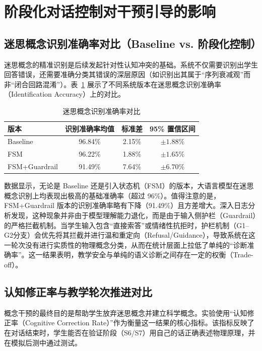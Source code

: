 \section{阶段化对话控制对干预引导的影响}
\label{sec:5.2}

\subsection{迷思概念识别准确率对比（Baseline vs. 阶段化控制）}
\label{subsec:5.2.1}

迷思概念的精准识别是后续发起针对性认知冲突的基础。系统不仅需要识别出学生回答错误，还需要准确分类其错误的深层原因（如识别出其属于“序列衰减观”而非“闭合回路混淆”）。表~\ref{tab:identification-accuracy} 展示了不同系统版本在迷思概念识别准确率（Identification Accuracy）上的对比。

\begin{table}[htbp]
    \centering
    \caption{迷思概念识别准确率对比}
    \label{tab:identification-accuracy}
    \begin{tabular}{lccc}
        \hline
        \textbf{版本} & \textbf{识别准确率均值} & \textbf{标准差} & \textbf{95\% 置信区间} \\
        \hline
        Baseline & 96.84\% & 2.15\% & $\pm 1.88\%$ \\
        FSM & 96.22\% & 1.88\% & $\pm 1.65\%$ \\
        FSM+Guardrail & 91.49\% & 7.64\% & $\pm 6.70\%$ \\
        \hline
    \end{tabular}
\end{table}

数据显示，无论是 Baseline 还是引入状态机（FSM）的版本，大语言模型在迷思概念识别上均表现出极高的基础准确率（超过 96\%）。值得注意的是，FSM+Guardrail 版本的识别准确率略有下降（91.49\%）且方差增大。深入日志分析发现，这种现象并非由于模型理解能力退化，而是由于输入侧护栏（Guardrail）的严格拦截机制。当学生输入包含“直接索答”或情绪性抗拒时，护栏机制（G1--G2分支）会优先将其拦截并进行温和重定向（Refusal/Guidance），导致系统在这一轮次没有进行实质性的物理概念分类，从而在统计层面上拉低了单纯的“诊断准确率”。这一结果表明，教学安全与单纯的语义诊断之间存在一定的权衡（Trade-off）。

\subsection{认知修正率与教学轮次推进对比}
\label{subsec:5.2.2}

概念干预的最终目的是帮助学生放弃迷思概念并建立科学概念。实验使用“认知修正率（Cognitive Correction Rate）”作为衡量这一结果的核心指标。该指标反映了在对话结束时，学生能否在验证阶段（S6/S7）用自己的话正确表述物理原理，并在模拟后测中通过测试。

